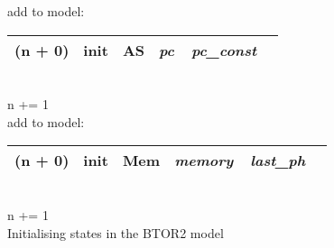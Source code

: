\begin{algorithm}
    add to model:\\
    \begin{tabular}[h]{>{\ttfamily\color{UniRed}}r >{\ttfamily}l >{\ttfamily\color{UniGrey}}l >{\itshape\color{UniRed}}l >{\itshape} l}
        \hline
        \hline
        \ttfamily
        (n + 0) & init & AS & pc\ \ pc\_const & \\
        \hline
        \hline
    \end{tabular}\\
    \textcolor{UniRed}{n} += 1\\
    \BlankLine
    \BlankLine
    add to model:\\
    \begin{tabular}[h]{>{\ttfamily\color{UniRed}}r >{\ttfamily}l >{\ttfamily\color{UniGrey}}l >{\itshape\color{UniRed}}l >{\itshape} l}
        \hline
        \hline
        \ttfamily
        (n + 0) & init & Mem & memory\ \ last\_ph & \\
        \hline
        \hline
    \end{tabular}\\
    \textcolor{UniRed}{n} += 1\\
    \caption[Initialising states]{Initialising states in the BTOR2 model}\label{alg:initstate}
\end{algorithm}